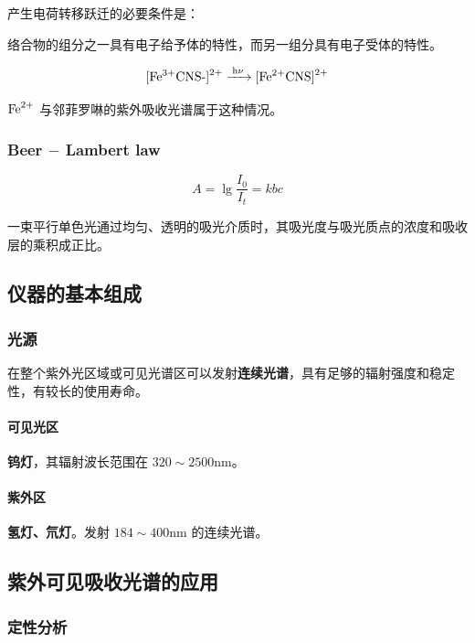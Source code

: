 产生电荷转移跃迁的必要条件是：

络合物的组分之一具有电子给予体的特性，而另一组分具有电子受体的特性。

\begin{equation}
    \ce{{[Fe^{3+}CNS-]}^{2+} ->[h\nu] {[Fe^{2+}CNS]}^{2+}}
\end{equation}

$\ce{Fe^{2+}}$ 与邻菲罗啉的紫外吸收光谱属于这种情况。

\subsubsection{Beer $-$ Lambert law}

\begin{equation}
    A = \lg \frac{I_0}{I_t} = kbc
\end{equation}

一束平行单色光通过均匀、透明的吸光介质时，其吸光度与吸光质点的浓度和吸收层的乘积成正比。

\subsection{仪器的基本组成}

\subsubsection{光源}

在整个紫外光区域或可见光谱区可以发射\textbf{连续光谱}，具有足够的辐射强度和稳定
性，有较长的使用寿命。

\paragraph{可见光区} \textbf{钨灯}，其辐射波长范围在 $320 \sim 2500 \mathrm{nm}$。

\paragraph{紫外区} \textbf{氢灯、氘灯}。发射 $184 \sim 400 \mathrm{nm}$ 的连续光谱。

\subsection{紫外可见吸收光谱的应用}

\subsubsection{定性分析}

